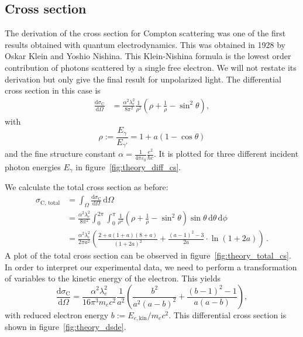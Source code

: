 \subsection{Cross section}
\label{sec:cross_section}
The derivation of the cross section for Compton scattering was one of the first results obtained with quantum 
electrodynamics. This was obtained in 1928 by Oskar Klein and Yoshio Nishina. This Klein-Nishina formula is the lowest 
order contribution of photons scattered by a single free electron. We will not restate its derivation 
but only give the final result for unpolarized light. The differential cross section in this case 
is\cite{schmueser2011feynman}
\begin{equation}
    \begin{split}
        \frac{\text{d} \sigma_\text{C}}{\text{d} \Omega} 
        &= \frac{\alpha^2 \lambda_e^2}{8 \pi^2} \frac{1}{\rho^2}\left(\rho + \frac{1}{\rho} - \sin^2\theta\right) ,
        \label{eq:kn_diff}
    \end{split}
\end{equation}
with 
\begin{equation}
    \rho := \frac{E_\gamma}{E_{\gamma'}}  = 1 + a(1 - \cos\theta) 
    \label{eq:rho}
\end{equation}
and the fine structure constant $\alpha = \frac{1}{4 \pi \varepsilon_0} \frac{e^2}{\hbar c}$.   
It is plotted for three different incident photon energies $E_\gamma$ in figure~\ref{fig:theory_diff_cs}. 

We calculate the total cross section as before:\cite{ver}
\begin{equation}
    \begin{split}
        \sigma_\text{C, total} &= \int_\Omega \! \frac{\text{d} \sigma_\text{C}}{\text{d} \Omega}  \, \text{d}\Omega \\
            &= \frac{\alpha^2 \lambda_e^2}{8\pi^2} \int_0^{2\pi} \! \int_0^{\pi} \! 
        \frac{1}{\rho^2}\left(\rho + \frac{1}{\rho} - \sin^2\theta\right) \sin\theta \, \text{d}\theta  \, \text{d}\phi \\
        &=\frac{\alpha^2 \lambda_e^2}{2\pi a^2} \left(
            \frac{2 + a(1 + a)(8 + a)}{(1 + 2a)^2} + 
            \frac{(a - 1)^2 - 3}{2a} \cdot \ln(1 + 2a)\right)   \,.
        \label{eq:total_compton}
    \end{split}
\end{equation}
A plot of the total cross section can be observed in figure~\ref{fig:theory_total_cs}. In order to interpret our 
experimental data, we need to perform a transformation of variables to the kinetic energy of the electron. This 
yields\cite{ver}
\begin{equation}
    \frac{\text{d} \sigma_\text{C}}{\text{d} \Omega} 
    = \frac{\alpha^2 \lambda_e^2}{16 \pi^3 m_e c^2}  \frac{1}{a^2}\left(
        \frac{b^2}{a^2(a - b)^2} + \frac{(b - 1)^2 - 1}{a (a - b)} \right) ,
    \label{eq:dode}
\end{equation}
with reduced electron energy $b := E_{e, \text{kin}} / m_ec^2$. This differential cross section is shown in 
figure~\ref{fig:theory_dsde}.

